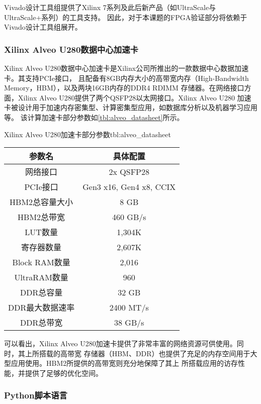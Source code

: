 Vivado设计工具组提供了Xilinx 7系列及此后新产品（如UltraScale与UltraScale+系列）的工具支持。
因此，对于本课题的FPGA验证部分将依赖于Vivado设计工具组展开。

\subsubsection{Xilinx Alveo U280数据中心加速卡}

Xilinx Alveo U280数据中心加速卡是Xilinx公司所推出的一款数据中心数据加速卡。其支持PCIe接口，
且配备有8GB内存大小的高带宽内存（High-Bandwidth Memory，HBM），以及两块16GB内存的DDR4 RDIMM
存储器。在网络接口方面，Xilinx Alveo U280提供了两个QSFP28以太网接口。Xilinx Alveo U280
加速卡被设计用于加速内存密集型、计算密集型应用，如数据库分析以及机器学习应用等\cite{alveo2021datasheet}。
该计算加速卡部分参数如\autoref{tbl:alveo_datasheet}所示。

\begin{generaltab}{Xilinx Alveo U280加速卡部分参数\cite{alveo2021datasheet}}{tbl:alveo_datasheet}
  \begin{tabular}{cc}
    \toprule
    参数名 & 具体配置 \\
    \midrule
    网络接口 & 2x QSFP28 \\
    PCIe接口 & Gen3 x16, Gen4 x8, CCIX \\
    HBM2总容量大小 & 8 GB \\
    HBM2总带宽 & 460 GB/s \\
    LUT数量 & 1,304K \\
    寄存器数量 & 2,607K \\
    Block RAM数量 & 2,016 \\
    UltraRAM数量 & 960 \\
    DDR总容量 & 32 GB \\
    DDR最大数据速率 & 2400 MT/s \\
    DDR总带宽 & 38 GB/s \\
    \bottomrule
  \end{tabular}
\end{generaltab}

可以看出，Xilinx Alveo U280加速卡提供了非常丰富的网络资源可供使用。同时，其上所搭载的高带宽
存储器（HBM、DDR）也提供了充足的内存空间用于大型应用使用。HBM2所提供的高带宽则充分地保障了其上
所搭载应用的访存性能，并提供了足够的优化空间。

\subsubsection{Python脚本语言}

